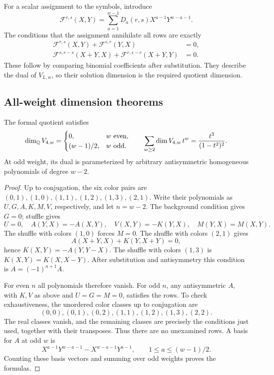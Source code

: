 For a scalar assignment to the symbols, introduce
\[
 \mathscr F^{r,s}(X,Y)=
 \sum_{a=1}^{w-1}D_a(r,s)X^{a-1}Y^{w-a-1}.
\]
The conditions that the assignment annihilate all rows are exactly
\begin{align}
 \mathscr F^{r,s}(X,Y)+\mathscr F^{s,r}(Y,X)&=0,
 \label{eq:poly-stuffle}\\
 \mathscr F^{s,r-s}(X+Y,X)+
       \mathscr F^{r,s-r}(X+Y,Y)&=0.
 \label{eq:poly-shuffle}
\end{align}
These follow by comparing binomial coefficients after substitution.
They describe the dual of \(V_{L,w}\), so their solution dimension is
the required quotient dimension.

\subsection{All-weight dimension theorems}

\begin{theorem}\label{thm:level-four}
The formal quotient satisfies
\[
 \dim_\mathbb Q V_{4,w}=
 \begin{cases}
 0,&w\ \text{even},\\
 (w-1)/2,&w\ \text{odd}.
 \end{cases}
 \qquad
 \sum_{w\geq2}\dim V_{4,w}\,t^w=\frac{t^3}{(1-t^2)^2}.
\]
At odd weight, its dual is parameterized by arbitrary antisymmetric
homogeneous polynomials of degree \(w-2\).
\end{theorem}

\begin{proof}
Up to conjugation, the six color pairs are
\((0,1),(1,0),(1,1),(1,2),(1,3),(2,1)\).
Write their polynomials as \(U,G,A,K,M,V\), respectively, and let
\(n=w-2\). The background condition gives \(G=0\);
stuffle gives
\[
 U=0,\quad A(Y,X)=-A(X,Y),\quad
 V(X,Y)=-K(Y,X),\quad M(Y,X)=M(X,Y).
\]
The shuffle with colors \((1,0)\) forces \(M=0\).
The shuffle with colors \((2,1)\) gives
\[
 A(X+Y,X)+K(Y,X+Y)=0,
\]
hence \(K(X,Y)=-A(Y,Y-X)\).
The shuffle with colors \((1,3)\) is
\(K(X,Y)=K(X,X-Y)\).
After substitution and antisymmetry this condition is
\(A=(-1)^{n+1}A\).

For even \(n\) all polynomials therefore vanish.
For odd \(n\), any antisymmetric \(A\), with \(K,V\) as above and
\(U=G=M=0\), satisfies the rows. To check exhaustiveness, the
unordered color classes up to conjugation are
\[
 (0,0),(0,1),(0,2),(1,1),(1,2),(1,3),(2,2).
\]
The real classes vanish, and the remaining classes are precisely the
conditions just used, together with their transposes. Thus there are
no unexamined rows.
A basis for \(A\) at odd \(w\) is
\[
 X^{a-1}Y^{w-a-1}-X^{w-a-1}Y^{a-1},
 \qquad 1\leq a\leq(w-1)/2.
\]
Counting these basis vectors and summing over odd weights proves
the formulas.
\end{proof}


